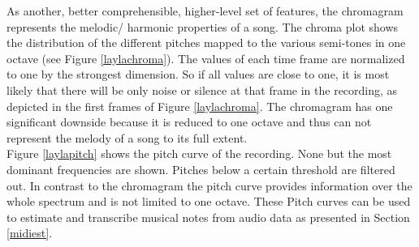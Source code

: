As another, better comprehensible, higher-level set of features, the chromagram represents the melodic/ harmonic properties of a song. The chroma plot shows the distribution of the different pitches mapped to the various semi-tones in one octave (see Figure \ref{laylachroma}). The values of each time frame are normalized to one by the strongest dimension. So if all values are close to one, it is most likely that there will be only noise or silence at that frame in the recording, as depicted in the first frames of Figure \ref{laylachroma}. The chromagram has one significant downside because it is reduced to one octave and thus can not represent the melody of a song to its full extent.\\
Figure \ref{laylapitch} shows the pitch curve of the recording. None but the most dominant frequencies are shown. Pitches below a certain threshold are filtered out. In contrast to the chromagram the pitch curve provides information over the whole spectrum and is not limited to one octave. These Pitch curves can be used to estimate and transcribe musical notes from audio data as presented in Section \ref{midiest}.\\

